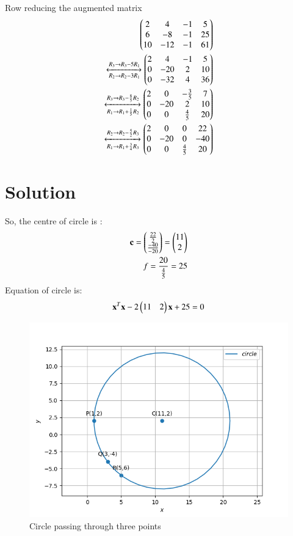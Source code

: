 \documentclass[journal,12pt,twocolumn]{IEEEtran}
\begin{document}
Row reducing the augmented matrix
\begin{align}
    \begin{pmatrix} 2 & 4 & -1 & 5 \\ 6 & -8 & -1 & 25 \\ 10 & -12 & -1 & 61  \end{pmatrix} \\
    \xleftrightarrow[R_2 \rightarrow R_2 - 3 R_1]{R_3 \rightarrow R_3 - 5 R_1}
    \begin{pmatrix} 2 & 4 & -1 & 5 \\ 0 & -20 & 2 & 10 \\ 0 & -32 & 4 & 36 \end{pmatrix} \\
    \xleftrightarrow[R_1 \rightarrow R_1 + \frac{1}{5} R_2]{R_3 \rightarrow R_3 - \frac{8}{5} R_2}
    \begin{pmatrix} 2 & 0 & -\frac{3}{5} & 7 \\ 0 & -20 & 2 & 10 \\ 0 & 0 & \frac{4}{5} & 20  \end{pmatrix} \\
    \xleftrightarrow[R_1 \rightarrow R_1 + \frac{3}{4} R_3]{R_2 \rightarrow R_2 - \frac{5}{2} R_3}
    \begin{pmatrix} 2 & 0 & 0 & 22 \\ 0 & -20 & 0 & -40 \\ 0 & 0 & \frac{4}{5} & 20  \end{pmatrix}
\end{align}
\section{Solution}
So, the centre of circle is :
\begin{align}
   \mathbf{c} = \begin{pmatrix}  \frac{22}{2} \\ \frac{-40}{-20} \end{pmatrix} = \begin{pmatrix}  11 \\ 2 \end{pmatrix}  \\
    f = \frac{20}{\frac{4}{5}} = 25 
\end{align}
Equation of circle is:
\begin{align}
    \mathbf{x}^T \mathbf{x} -2\begin{pmatrix}  11 & 2 \end{pmatrix} \mathbf{x} + 25 = 0 
\end{align}
\begin{figure}[t]
    \centering
    \includegraphics[width = \columnwidth]{AI_assignment_3.png}
    \caption{Circle passing through three points}
    \label{fig:Circle}
\end{figure}
\end{document}
